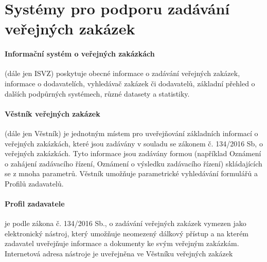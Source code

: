 \documentclass[thesis=M,czech]{FITthesis}[2019/12/23]
\begin{document}
\section{Systémy pro podporu zadávání veřejných zakázek}

\paragraph{Informační systém o veřejných zakázkách}
(dále jen ISVZ) poskytuje obecné informace o zadávání veřejných zakázek, informace o dodavatelích, vyhledávač zakázek či dodavatelů, základní přehled o dalších podpůrných systémech, různé datasety a statistiky.

\paragraph{Věstník veřejných zakázek}
(dále jen Věstník) je jednotným místem pro uveřejňování základních informací o veřejných zakázkách, které jsou zadávány v souladu se zákonem č. 134/2016 Sb, o veřejných zakázkách. Tyto informace jsou zadávány formou  (například Oznámení o zahájení zadávacího řízení, Oznámení o výsledku zadávacího řízení) skládajících se z mnoha parametrů.
Věstník umožňuje parametrické vyhledávání formulářů a Profilů zadavatelů. 

\paragraph{Profil zadavatele} je podle zákona č. 134/2016 Sb., o zadávání veřejných zakázek vymezen jako elektronický nástroj, který umožňuje neomezený dálkový přístup a na kterém zadavatel uveřejňuje informace a dokumenty ke svým veřejným zakázkám. Internetová adresa nástroje je uveřejněna ve Věstníku veřejných zakázek

\end{document}
